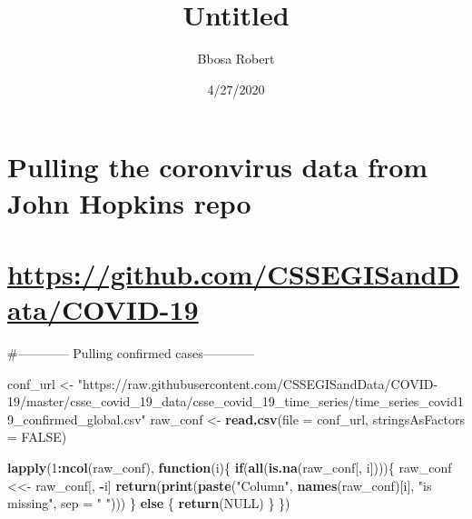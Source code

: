 \documentclass[
]{article}
\title{Untitled}
\author{Bbosa Robert}
\date{4/27/2020}
\newenvironment{Shaded}{\begin{snugshade}}{\end{snugshade}}
\newcommand{\ControlFlowTok}[1]{\textcolor[rgb]{0.13,0.29,0.53}{\textbf{#1}}}
\newcommand{\DataTypeTok}[1]{\textcolor[rgb]{0.13,0.29,0.53}{#1}}
\newcommand{\DecValTok}[1]{\textcolor[rgb]{0.00,0.00,0.81}{#1}}
\newcommand{\KeywordTok}[1]{\textcolor[rgb]{0.13,0.29,0.53}{\textbf{#1}}}
\newcommand{\NormalTok}[1]{#1}
\newcommand{\OperatorTok}[1]{\textcolor[rgb]{0.81,0.36,0.00}{\textbf{#1}}}
\newcommand{\OtherTok}[1]{\textcolor[rgb]{0.56,0.35,0.01}{#1}}
\newcommand{\StringTok}[1]{\textcolor[rgb]{0.31,0.60,0.02}{#1}}
\begin{document}
\maketitle

{
\setcounter{tocdepth}{2}
\tableofcontents
}
\hypertarget{pulling-the-coronvirus-data-from-john-hopkins-repo}{%
\section{Pulling the coronvirus data from John Hopkins
repo}\label{pulling-the-coronvirus-data-from-john-hopkins-repo}}

\hypertarget{httpsgithub.comcssegisanddatacovid-19}{%
\section{\texorpdfstring{\url{https://github.com/CSSEGISandData/COVID-19}}{https://github.com/CSSEGISandData/COVID-19}}\label{httpsgithub.comcssegisanddatacovid-19}}

\#------------ Pulling confirmed cases------------

\begin{Shaded}
\begin{Highlighting}[]
\NormalTok{conf_url <-}\StringTok{ "https://raw.githubusercontent.com/CSSEGISandData/COVID-19/master/csse_covid_19_data/csse_covid_19_time_series/time_series_covid19_confirmed_global.csv"}
\NormalTok{raw_conf <-}\StringTok{ }\KeywordTok{read.csv}\NormalTok{(}\DataTypeTok{file =}\NormalTok{ conf_url, }\DataTypeTok{stringsAsFactors =} \OtherTok{FALSE}\NormalTok{)}

\KeywordTok{lapply}\NormalTok{(}\DecValTok{1}\OperatorTok{:}\KeywordTok{ncol}\NormalTok{(raw_conf), }\ControlFlowTok{function}\NormalTok{(i)\{}
  \ControlFlowTok{if}\NormalTok{(}\KeywordTok{all}\NormalTok{(}\KeywordTok{is.na}\NormalTok{(raw_conf[, i])))\{}
\NormalTok{    raw_conf <<-}\StringTok{ }\NormalTok{raw_conf[, }\OperatorTok{-}\NormalTok{i]}
    \KeywordTok{return}\NormalTok{(}\KeywordTok{print}\NormalTok{(}\KeywordTok{paste}\NormalTok{(}\StringTok{"Column"}\NormalTok{, }\KeywordTok{names}\NormalTok{(raw_conf)[i], }\StringTok{"is missing"}\NormalTok{, }\DataTypeTok{sep =} \StringTok{" "}\NormalTok{)))}
\NormalTok{  \} }\ControlFlowTok{else}\NormalTok{ \{}
    \KeywordTok{return}\NormalTok{(}\OtherTok{NULL}\NormalTok{)}
\NormalTok{  \}}
\NormalTok{\})}
\end{Highlighting}
\end{Shaded}
\end{document}
